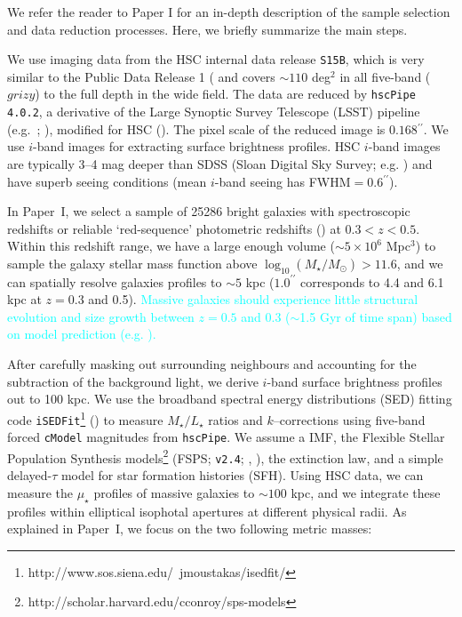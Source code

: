\documentclass[a4paper,fleqn,usenatbib]{mnras}
\def\arcsec{{\prime\prime}}
\def\asec{$^{\prime\prime}$}
\def\cmodel{\texttt{cModel}}
\def\logms{{$\log_{10} (M_{\star}/M_{\odot})$}}
\def\m2l{{$M_{\star}/L_{\star}$}}
\def\mden{{$\mu_{\star}$}}
\newcommand{\song}[1]{\textcolor{cyan}{#1}}
\begin{document}
    We refer the reader to Paper I for an in-depth description of the sample selection 
    and data reduction processes. 
    Here, we briefly summarize the main steps.
    
    We use imaging data from the HSC internal data release 
    \texttt{S15B}, which is very similar to the Public Data Release 1 
    (\citealt{HSC-DR1} and covers ${\sim} 110$ deg$^2$ in all five-band ($grizy$) to 
    the full depth in the wide field. 
    The data are reduced by \texttt{hscPipe 4.0.2}, a derivative of the 
    Large Synoptic Survey Telescope (LSST) pipeline (e.g.\ \citealt{Juric2015}; 
    \citealt{Axelrod2010}), modified for HSC (\citealt{HSC-PIPE}).
    The pixel scale of the reduced image is $0.168$\asec{}.
    We use $i$-band images for extracting surface brightness profiles. 
    HSC $i$-band images are typically 3--4 mag deeper than SDSS 
    (Sloan Digital Sky Survey; e.g. \citealt{SDSS-DR7, SDSS-DR8, SDSS-DR12})  
    and have superb seeing conditions (mean $i$-band seeing has FWHM$=0.6$\asec{}).
    
    In Paper~I, we select a sample of 25286 bright galaxies with spectroscopic 
    redshifts or reliable `red-sequence' photometric redshifts (\citealt{Rykoff2014}) 
    at $0.3<z<0.5$. 
    Within this redshift range, we have a large enough volume 
    ($\sim5\times 10^6$ Mpc$^3$) to sample the galaxy stellar mass function above 
    \logms$>11.6$, and we can spatially resolve galaxies profiles to $\sim 5$ kpc 
    ($1.0^{\arcsec}$ corresponds to 4.4 and 6.1 kpc at $z=0.3$ and 0.5). 
    \song{
    Massive galaxies should experience little structural evolution and 
    size growth between $z=0.5$ and 0.3 ($\sim$1.5 Gyr of time span) 
    based on model prediction (e.g. \citealt{Shankar2015}).
    }
    
    After carefully 
    masking out surrounding neighbours and accounting for the subtraction of the 
    background light, we derive $i$-band surface brightness profiles out to 100 kpc. 
    We use the broadband spectral energy distributions (SED) fitting code 
    \texttt{iSEDFit}\footnote{http://www.sos.siena.edu/~jmoustakas/isedfit/} 
    (\citealt{Moustakas13}) to measure \m2l{} ratios and $k$--corrections using 
    five-band forced \cmodel{} magnitudes from \texttt{hscPipe}. 
    We assume a \citet{Chabrier2003} IMF, the Flexible Stellar Population 
    Synthesis models\footnote{http://scholar.harvard.edu/cconroy/sps-models}
    (FSPS; \texttt{v2.4}; \citealt{FSPS}, \citealt{Conroy2010}), the 
    \citet{Calzetti2000} extinction law, and a simple delayed-$\tau$ model for 
    star formation histories (SFH). 
    Using HSC data, we can measure the \mden{} profiles of massive galaxies to 
    $\sim 100$ kpc, and we integrate these profiles within elliptical isophotal
    apertures at different physical radii. 
    As explained in Paper~I, we focus on the two following metric masses:
        
\end{document}
